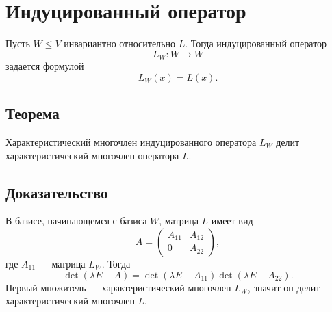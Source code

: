 \documentclass[12pt,a4paper]{article}
\begin{document}
\section{Индуцированный оператор}

Пусть $W\le V$ инвариантно относительно $L$. Тогда индуцированный оператор
\[
    L_W:W\to W
\]
задается формулой
\[
    L_W(x)=L(x).
\]

\subsection*{Теорема}

Характеристический многочлен индуцированного оператора $L_W$ делит характеристический многочлен оператора $L$.

\subsection*{Доказательство}

В базисе, начинающемся с базиса $W$, матрица $L$ имеет вид
\[
    A=
    \begin{pmatrix}
        A_{11} & A_{12}\\
        0 & A_{22}
    \end{pmatrix},
\]
где $A_{11}$ --- матрица $L_W$. Тогда
\[
    \det(\lambda E-A)=
    \det(\lambda E-A_{11})\det(\lambda E-A_{22}).
\]
Первый множитель --- характеристический многочлен $L_W$, значит он делит характеристический многочлен $L$.
\end{document}
